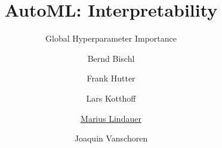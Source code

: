 




\title[AutoML: Global Importance]{AutoML: Interpretability}
\subtitle{Global Hyperparameter Importance}
\author[Marius Lindauer]{Bernd Bischl \and Frank Hutter \and Lars Kotthoff\newline \and \underline{Marius Lindauer} \and Joaquin Vanschoren}
\institute{}
\date{}



	
	\maketitle
	

